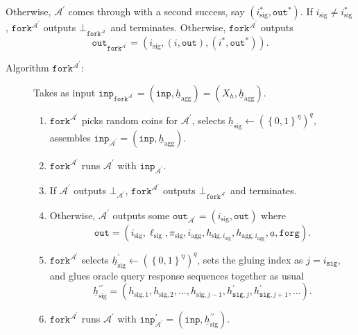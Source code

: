\documentclass{iacrtrans}
\theoremstyle{definition}
\numberwithin{theorem}{subsection}
\numberwithin{lemma}{theorem}
\newcommand{\adversary}{\mathcal{A}}
\begin{document}
Otherwise, $\adversary^{\prime}$ comes through with a second success, say $(i_{\text{sig}}^*, \texttt{out}^*)$. If $i_{\text{sig}} \neq i_{\text{sig}}^*$, $\texttt{fork}^{\adversary^\prime}$ outputs $\bot_{\texttt{fork}^{\adversary^\prime}}$ and terminates. Otherwise, $\texttt{fork}^{\adversary^\prime}$ outputs \[\texttt{out}_{\texttt{fork}^{\adversary^\prime}} = (i_{\text{sig}}, (i, \texttt{out}), (i^*, \texttt{out}^*)).\]

\begin{description}

\item [Algorithm $\texttt{fork}^{\adversary^\prime}$:] Takes as input $\texttt{inp}_{\texttt{fork}^{\adversary^\prime}} = (\texttt{inp}, \underline{h}_{\text{agg}}) = (X_h, \underline{h}_{\text{agg}})$. 
\begin{enumerate}
\item $\texttt{fork}^{\adversary^\prime}$ picks random coins for $\adversary^\prime$, selects $\underline{h}_{\text{sig}} \leftarrow (\left\{0,1\right\}^{\eta})^q$,  assembles  $\texttt{inp}_{\adversary^\prime} = (\texttt{inp}, \underline{h}_{\text{agg}})$.

\item $\texttt{fork}^{\adversary^\prime}$ runs $\adversary^\prime$ with $\texttt{inp}_{\adversary^\prime}$.

\item If $\adversary^\prime$ outputs $\bot_{\adversary^\prime}$, $\texttt{fork}^{\adversary^\prime}$ outputs $\bot_{\texttt{fork}^{\adversary^\prime}}$ and terminates.

\item Otherwise, $\adversary^\prime$ outputs some $\texttt{out}_{\adversary^\prime} = (i_{\text{sig}}, \texttt{out})$ where \[\texttt{out} = (i_{\text{sig}}, \ell_{\text{sig}}, \pi_{\text{sig}}, i_{\text{agg}}, h_{\text{sig}, i_{\text{sig}}}, h_{\text{agg}, i_{\text{agg}}}, \underline{a}, \texttt{forg}).\]

\item $\texttt{fork}^{\adversary^\prime}$ selects $\underline{h}_{\text{sig}}^{\prime} \leftarrow (\left\{0,1\right\}^\eta)^q$, sets the gluing index as $j = i_{\texttt{sig}}$, and glues oracle query response sequences together as usual \[\underline{h}_{\text{sig}}^{\prime \prime}= (h_{\text{sig},1}, h_{\text{sig},2}, \ldots, h_{\text{sig}, j - 1}, h^{\prime}_{\texttt{sig}, j}, h^{\prime}_{\texttt{sig}, j+1}, \ldots).\]

\item $\texttt{fork}^{\adversary^\prime}$ runs $\adversary^\prime$ with $\texttt{inp}^{\prime}_{\adversary^\prime} = (\texttt{inp}, \underline{h}_{\text{sig}}^{\prime \prime})$.




\end{enumerate}
\end{description}
\end{document}
